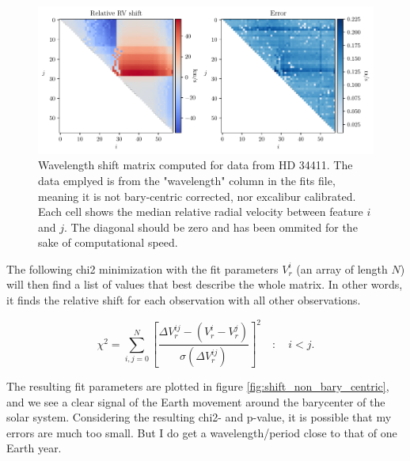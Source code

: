     \begin{figure}%
        \begin{wide}  
            \includegraphics[width=\textwidth]{figures/shfits_matrix_non_bary.pdf}
            \caption{Wavelength shift matrix computed for data from HD 34411. The data emplyed is from the "wavelength" column in the fits file, meaning it is not bary-centric corrected, nor excalibur calibrated. Each cell shows the median relative radial velocity between feature $i$ and $j$. The diagonal should be zero and has been ommited for the sake of computational speed.}
        \label{fig:shift_matrix}
        \end{wide}
    \end{figure}
            
    The following chi2 minimization with the fit parameters $V_r^i$ (an array of length $N$) will then find a list of values that best describe the whole matrix. In other words, it finds the relative shift for each observation with all other observations. 

    \begin{equation}
        \label{eq:matrix_reduction_fit}
        \chi^{2}=\sum_{i,j = 0}^{N}\left[\frac{ \Delta V_{r}^{ij} - (V_r^i - V_r^j) }{\sigma(\Delta V_{r}^{ij})}\right]^{2} \quad : \quad i < j.
    \end{equation}
    
    The resulting fit parameters are plotted in figure \ref{fig:shift_non_bary_centric}, and we see a clear signal of the Earth movement around the barycenter of the solar system. Considering the resulting chi2- and p-value, it is possible that my errors are much too small. But I do get a wavelength/period close to that of one Earth year.

